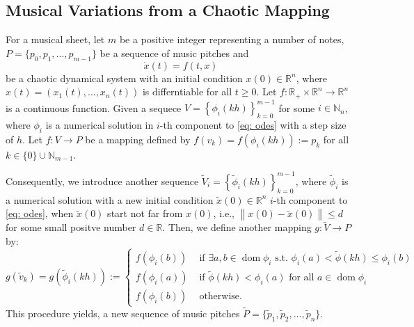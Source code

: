 \documentclass[11pt]{article}
\theoremstyle{definition}
\DeclareMathOperator{\dom}{dom}
\begin{document}
\subsection{Musical Variations from a Chaotic Mapping}

For a musical sheet, let $m$ be a positive integer representing a number of notes, $P = \{p_0, p_1, \dots, p_{m-1}\}$ be a sequence of music pitches and  
\begin{equation} \label{eq: odes}
\dot{x}(t) = f(t,x)
\end{equation}
be a chaotic dynamical system with an initial condition $x(0) \in \mathbb{R}^n$, where $x(t) = \left(x_1(t), \ldots, x_n(t)\right)$ is differntiable for all $t \geq 0$.
Let $f: \mathbb{R}_{+} \times \mathbb{R}^n \to \mathbb{R}^n$ is a continuous function. 
Given a sequece
$ V = \displaystyle\left\{\phi_i(kh) \right\}_{k=0}^{m-1}$ 
for some $i \in \mathbb{N}_n$, where $\phi_i$ is a numerical solution in $i$-th component to \eqref{eq: odes} with a step size of $h$.
Let $ f: V \to P$ be a mapping defined by 
$f(v_k) = f(\phi_i(kh)) := p_k$ for all $k \in \{0\}\cup\mathbb{N}_{m-1}$.

Consequently, we introduce another sequence $\widetilde{V}_i = \left\{\tilde{\phi}_i(kh) \right\}_{k=0}^{m-1}$, where $\tilde{\phi}_i$ is a numerical solution with a new initial condition $\tilde{x}(0) \in \mathbb{R}^n$ $i$-th component to \eqref{eq: odes}, 
when $\tilde{x}(0)$ start not far from $x(0)$, i.e., $ \left\lVert x(0) - \tilde{x}(0) \right\rVert \leq d$ for some small positve number $d \in \mathbb{R}$. Then, we define another mapping $g: \widetilde{V} \to P$ by: 
\[ g(\tilde{v}_k) = g\left(\tilde{\phi}_i(kh)\right) := 
\begin{cases}
  f(\phi_i(b)) & \text{ if }\exists a, b \in \dom{\phi_i} \text{ s.t. } \phi_i(a) < \tilde{\phi}(kh) \leq \phi_i(b) \\
  f(\phi_i(a)) & \text{ if } \tilde{\phi}(kh) < \phi_i(a) \text{ for all } a \in \dom{\phi_i} \\
  f(\phi_i(b)) & \text{ otherwise} .
\end{cases}
\]
This procedure yields, a new sequence of music pitches $\widetilde{P} =\{ \tilde{p}_1, \tilde{p}_2, \dots, \tilde{p}_n \}$.
\end{document}
